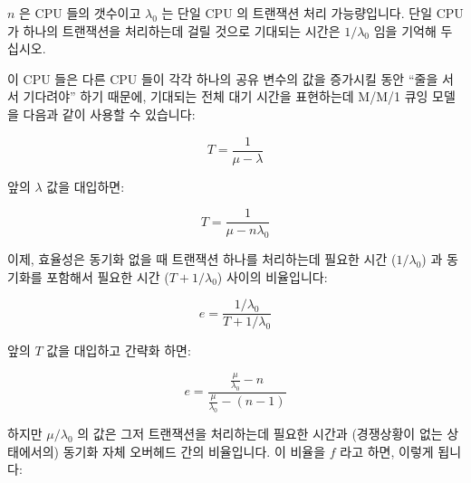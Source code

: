 $n$ 은 CPU 들의 갯수이고 $\lambda_0$ 는 단일 CPU 의 트랜잭션 처리 가능량입니다.
단일 CPU 가 하나의 트랜잭션을 처리하는데 걸릴 것으로 기대되는 시간은
$1 / \lambda_0$ 임을 기억해 두십시오.

이 CPU 들은 다른 CPU 들이 각각 하나의 공유 변수의 값을 증가시킬 동안
``줄을 서서 기다려야'' 하기 때문에, 기대되는 전체 대기 시간을 표현하는데 M/M/1
큐잉 모델을 다음과 같이 사용할 수 있습니다:

\begin{equation}
	T = \frac{1}{\mu - \lambda}
\end{equation}

앞의 $\lambda$ 값을 대입하면:

\begin{equation}
	T = \frac{1}{\mu - n \lambda_0}
\end{equation}

이제, 효율성은 동기화 없을 때 트랜잭션 하나를 처리하는데 필요한 시간 ($1 /
\lambda_0$) 과 동기화를 포함해서 필요한 시간 ($T + 1 / \lambda_0$) 사이의
비율입니다:

\begin{equation}
	e = \frac{1 / \lambda_0}{T + 1 / \lambda_0}
\end{equation}

앞의 $T$ 값을 대입하고 간략화 하면:

\begin{equation}
	e = \frac{\frac{\mu}{\lambda_0} - n}{\frac{\mu}{\lambda_0} - (n - 1)}
\end{equation}

하지만 $\mu / \lambda_0$ 의 값은 그저 트랜잭션을 처리하는데 필요한 시간과
(경쟁상황이 없는 상태에서의) 동기화 자체 오버헤드 간의 비율입니다.
이 비율을 $f$ 라고 하면, 이렇게 됩니다:
\iffalse

